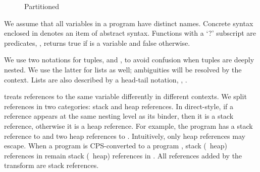 \documentclass{LMCS}
\theoremstyle{definition} \newtheorem{property}[thm]{Property}
\begin{document}
\begin{figure}[!t]
  \caption{Partitioned \cps \label{fig:pcps}}
\end{figure}

We assume that all variables in a program have distinct names.
Concrete syntax enclosed in \denot{\cdot} denotes an item of abstract syntax.
Functions with a `?' subscript are predicates, \eg,  returns
true if  is a variable and false otherwise.

We use two notations for tuples,  and 
, to avoid confusion when tuples are deeply nested.
We use the latter for lists as well; ambiguities will be resolved by the 
context.
Lists are also described by a head-tail notation, \eg, .

\cfat{} treats references to the same variable differently in different 
contexts.
We split references in two categories: stack and heap references.
In direct-style, if a reference appears at the same nesting level as its binder,
then it is a stack reference, otherwise it is a heap reference.
For example, the program  has a stack 
reference to  and two heap references to .
Intuitively, only heap references may escape.
When a program  is CPS-converted to a program , stack (\resp\ heap) 
references in  remain stack (\resp\ heap) references in .
All references added by the transform are stack references.
\end{document}
